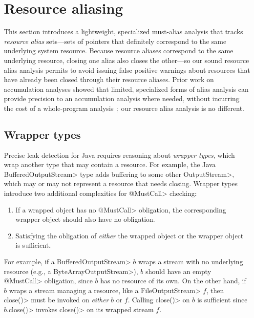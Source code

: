 \section{Resource aliasing}
\label{sec:must-call-choice}

This section introduces a lightweight, specialized must-alias analysis
that tracks \emph{resource alias} sets---sets of pointers that
definitely correspond to the same underlying system resource.  Because
resource aliases correspond to the same underlying resource, closing
one alias also closes the other---so our sound resource alias analysis
permits \Tool to avoid issuing false positive warnings about resources
that have already been closed through their resource aliases.  Prior
work on accumulation analyses showed that limited, specialized forms
of alias analysis can provide precision to an accumulation analysis
where needed, without incurring the cost of a whole-program
analysis~\cite{KelloggRSSE2020}; our resource alias analysis is no
different.

\subsection{Wrapper types}

Precise leak detection for Java requires reasoning about \emph{wrapper types},
which wrap another type that may contain a resource.  For example, the Java
\<BufferedOutputStream> type adds buffering to some other \<OutputStream>, which
may or may not represent a resource that needs closing.  Wrapper types
introduce two additional complexities for \<@MustCall> checking:
\begin{enumerate}
  \item If a wrapped object has no \<@MustCall> obligation, the corresponding
  wrapper object should also have no obligation.
  \item Satisfying the obligation of \emph{either} the wrapped object or the
  wrapper object is sufficient.
\end{enumerate}
For example, if a \<BufferedOutputStream> $b$ wraps a stream with no underlying
resource (e.g., a \<ByteArrayOutputStream>), $b$ should have an empty
\<@MustCall> obligation, since $b$ has no resource of its own.  On the other
hand, if $b$ wraps a stream managing a resource, like a \<FileOutputStream> $f$,
then \<close()> must be invoked on \emph{either} $b$ or $f$. Calling \<close()> on $b$
is sufficient since $b$\<.close()> invokes \<close()> on its wrapped stream $f$.


